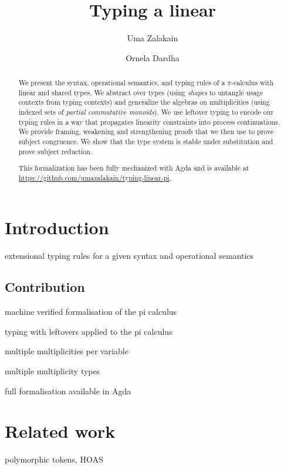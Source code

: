 \documentclass[a4paper,UKenglish,cleveref, autoref, thm-restate,authorcolumns]{lipics-v2019}
\title{Typing a linear \picalc}
\author{Uma Zalakain}{University of Glasgow, Scotland}
       {u.zalakain.1@research.gla.ac.uk}{https://orcid.org/0000-0002-3268-9338}{}
\author{Ornela Dardha}{University of Glasgow, Scotland}
       {ornela.dardha@glasgow.ac.uk}{https://orcid.org/0000-0001-9927-7875}{}
\newcommand{\picalc}{$\pi$-calculus}
\begin{document}
\maketitle

\begin{abstract}
  We present the syntax, operational semantics, and typing rules of a \picalc{} with linear and shared types.
  We abstract over types (using \emph{shapes} to untangle usage contexts from typing contexts) and generalize the algebras on multiplicities (using indexed sets of \emph{partial commutative monoids}).
  We use leftover typing \cite{Allais2018a} to encode our typing rules in a way that propagates linearity constraints into process continuations.
  We provide framing, weakening and strengthening proofs that we then use to prove subject congruence.
  We show that the type system is stable under substitution and prove subject reduction.

  This formalization has been fully mechanized with Agda and is available at \url{https://github.com/umazalakain/typing-linear-pi}.
\end{abstract}

\section{Introduction}

extensional typing rules for a given syntax and operational semantics

\subsection{Contribution}

machine verified formalisation of the pi calculus

typing with leftovers applied to the pi calculus

multiple multiplicities per variable

multiple multiplicity types

full formalisation available in Agda

\section{Related work}

\cite{previous-work} polymorphic tokens, HOAS
\end{document}
